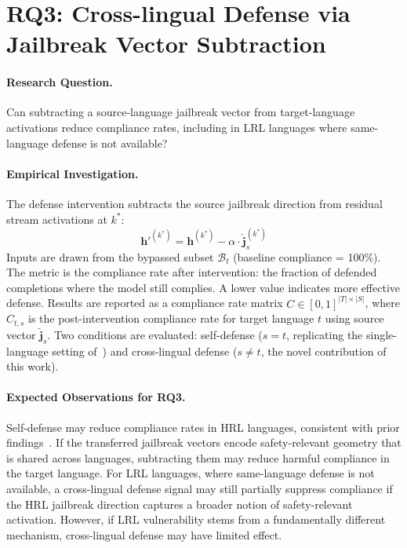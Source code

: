 \section{RQ3: Cross-lingual Defense via Jailbreak Vector Subtraction}
\label{sec:rq3}

\paragraph{Research Question.}
Can subtracting a source-language jailbreak vector from target-language activations reduce compliance rates, including in LRL languages where same-language defense is not available?

\paragraph{Empirical Investigation.}
The defense intervention subtracts the source jailbreak direction from residual stream activations at $k^*$:
%
\begin{equation}
    \mathbf{h}'^{(k^*)} = \mathbf{h}^{(k^*)} - \alpha \cdot \hat{\mathbf{j}}_s^{(k^*)}
    \label{eq:defense}
\end{equation}
%
Inputs are drawn from the bypassed subset $\mathcal{B}_t$ (baseline compliance = 100\%). The metric is the compliance rate after intervention: the fraction of defended completions where the model still complies. A lower value indicates more effective defense. Results are reported as a compliance rate matrix $C \in [0,1]^{|T| \times |S|}$, where $C_{t,s}$ is the post-intervention compliance rate for target language $t$ using source vector $\hat{\mathbf{j}}_s$. Two conditions are evaluated: self-defense ($s = t$, replicating the single-language setting of~\citet{arditi2024refusal}) and cross-lingual defense ($s \neq t$, the novel contribution of this work).

\paragraph{Expected Observations for RQ3.}
Self-defense may reduce compliance rates in HRL languages, consistent with prior findings~\citep{arditi2024refusal}. If the transferred jailbreak vectors encode safety-relevant geometry that is shared across languages, subtracting them may reduce harmful compliance in the target language. For LRL languages, where same-language defense is not available, a cross-lingual defense signal may still partially suppress compliance if the HRL jailbreak direction captures a broader notion of safety-relevant activation. However, if LRL vulnerability stems from a fundamentally different mechanism, cross-lingual defense may have limited effect.

